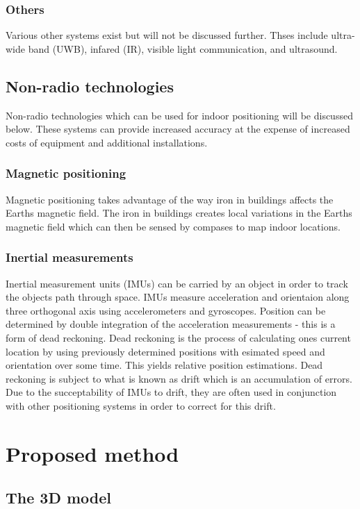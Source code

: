 \documentclass[11pt,a4paper]{article}
\begin{document}
	\subsubsection{Others}
		Various other systems exist but will not be discussed further. Thses include ultra-wide band (UWB), infared (IR), visible light communication, and ultrasound.
	
	\subsection{Non-radio technologies}
		Non-radio technologies which can be used for indoor positioning will be discussed below. These systems can provide increased accuracy at the expense of increased costs of equipment and additional installations.
	
	\subsubsection{Magnetic positioning}
		Magnetic positioning takes advantage of the way iron in buildings affects the Earths magnetic field. The iron in buildings creates local variations in the Earths magnetic field which can then be sensed by compases to map indoor locations.
		\cite{supreeth_sudhakaran_geospatial_2014}
	
	\subsubsection{Inertial measurements}
		Inertial measurement units (IMUs) can be carried by an object in order to track the objects path through space. IMUs measure acceleration and orientaion along three orthogonal axis using accelerometers and gyroscopes. Position can be determined by double integration of the acceleration measurements - this is a form of dead reckoning. Dead reckoning is the process of calculating ones current location by using previously determined positions with esimated speed and orientation over some time. This yields relative position estimations. Dead reckoning is subject to what is known as drift which is an accumulation of errors. Due to the succeptability of IMUs to drift, they are often used in conjunction with other positioning systems in order to correct for this drift.

\newpage
\section{Proposed method}
	\subsection{The 3D model}
\end{document}
